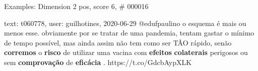 \begin{frame}{Examples: Dimension 2 pos, score 6, \# 000016}
\footnotesize
\begin{exampleblock}{text: t060778, user: guilhotines, 2020-06-29}
@edufpaulino o esquema é mais ou menos esse. obviamente por se tratar de uma 
pandemia, tentam gastar o mínimo de tempo possível, mas ainda assim não tem 
como ser TÃO rápido, senão \textbf{corremos} o \textbf{risco} de utilizar uma 
vacina com \textbf{efeitos} \textbf{colaterais} perigosos ou sem 
\textbf{comprovação} de \textbf{eficácia} . https://t.co/GdcbAypXLK 
\end{exampleblock}
\end{frame}
